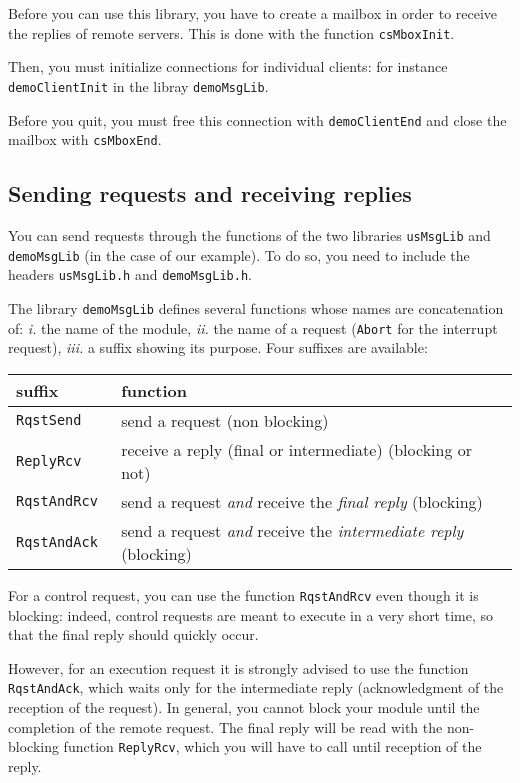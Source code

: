 Before you can use this library, you have to create a mailbox in order to
receive the replies  of remote servers. This is   done with the  function
{\tt csMboxInit}.

Then, you  must  initialize   connections  for individual    clients: for
instance {\tt demoClientInit} in the libray {\tt demoMsgLib}.

Before you  quit, you must  free this connection with {\tt demoClientEnd}
and close the mailbox with {\tt csMboxEnd}.


\subsection{Sending requests and receiving replies}

You   can send requests  through the  functions  of the two
libraries  {\tt usMsgLib}   and {\tt  demoMsgLib}  (in  the case of   our
example). To do so, you need to include the  headers {\tt usMsgLib.h} and
{\tt demoMsgLib.h}.

The library {\tt demoMsgLib}  defines  several functions whose  names are
concatenation of: {\em i.} the name of the module, {\em  ii.} the name of
a request ({\tt  Abort} for the interrupt request),  {\em iii.} a  suffix
showing its purpose. Four suffixes are available:


\begin{center}\small\begin{tabularx}{\linewidth}{|l|X|}
\hline
suffix & function \\
\hline
\tt RqstSend & send a request (non blocking) \\

\tt ReplyRcv & receive a reply (final or intermediate)  (blocking or not)\\

\tt RqstAndRcv & send a request {\em and} receive the {\em final reply}
(blocking) \\

\tt RqstAndAck & send a request {\em and} receive the {\em intermediate reply}
(blocking) \\
\hline
\end{tabularx}\end{center}

For a  control request, you  can use  the function  {\tt RqstAndRcv} even
though it is blocking: indeed, control requests are meant to execute in a
very short time, so that the final reply should quickly occur.

However, for  an  execution request it   is strongly advised   to use the
function {\tt  RqstAndAck}, which waits only  for the  intermediate reply
(acknowledgment of the reception of the request).  In general, you cannot
block your module until the completion of the  remote request.  The final
reply will be  read with the  non-blocking function {\tt ReplyRcv}, which
you will have to call until reception of the reply.

